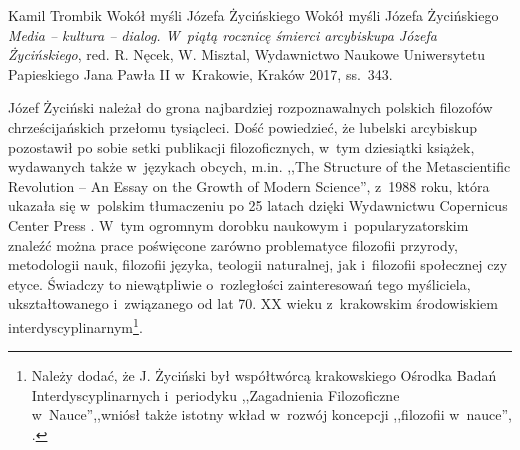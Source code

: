 \begin{recplenv}{Kamil Trombik}
	{Wokół myśli Józefa Życińskiego}
	{Wokół myśli Józefa Życińskiego}
	{\textit{Media -- kultura -- dialog. W~piątą rocznicę śmierci arcybiskupa Józefa Życińskiego}, red. R. Nęcek, W. Misztal, Wydawnictwo Naukowe Uniwersytetu Papieskiego Jana Pawła II w~Krakowie, Kraków 2017, ss.~343.}







Józef Życiński należał do grona najbardziej rozpoznawalnych polskich filozofów chrześcijańskich przełomu tysiącleci. Dość powiedzieć, że lubelski arcybiskup pozostawił po sobie setki publikacji filozoficznych, w~tym dziesiątki książek, wydawanych także w~językach obcych, m.in. ,,The Structure of the Metascientific Revolution -- An Essay on the Growth of Modern Science'', z~1988 roku, która ukazała się w~polskim tłumaczeniu po 25 latach dzięki Wydawnictwu Copernicus Center Press
\parencite[][]{zycinski_struktura_2013}.%
 W~tym ogromnym dorobku naukowym i~popularyzatorskim znaleźć można prace poświęcone zarówno problematyce filozofii przyrody, metodologii nauk, filozofii języka, teologii naturalnej, jak i~filozofii społecznej czy etyce. Świadczy to niewątpliwie o~rozległości zainteresowań tego myśliciela, ukształtowanego i~związanego od lat 70. XX wieku z~krakowskim środowiskiem interdyscyplinarnym\footnote{Należy dodać, że J. Życiński był współtwórcą krakowskiego Ośrodka Badań Interdyscyplinarnych i~periodyku ,,Zagadnienia Filozoficzne w~Nauce'',,wniósł także istotny wkład w~rozwój koncepcji ,,filozofii w~nauce'', 
\parencite[zob. np.][]{polak_philosophy_2019}.%
}.


\end{recplenv}
